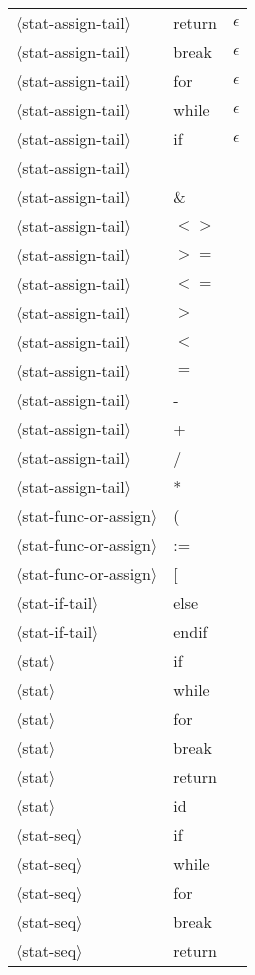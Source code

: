 \documentclass[11pt, fleqn]{article}
\newcommand{\atag}[1]{$\langle$#1$\rangle$}
\begin{document}
\begin{longtable}{l|l|l}
\atag{stat-assign-tail}			&	return			&	$\epsilon$	\\
\atag{stat-assign-tail}			&	break			&	$\epsilon$	\\
\atag{stat-assign-tail}			&	for			&	$\epsilon$	\\
\atag{stat-assign-tail}			&	while			&	$\epsilon$	\\
\atag{stat-assign-tail}			&	if			&	$\epsilon$	\\
\atag{stat-assign-tail}			&	\textbar		&		\\
\atag{stat-assign-tail}			&	\&			&		\\
\atag{stat-assign-tail}			&	$<>$			&		\\
\atag{stat-assign-tail}			&	$>=$			&		\\
\atag{stat-assign-tail}			&	$<=$			&		\\
\atag{stat-assign-tail}			&	$>$			&		\\
\atag{stat-assign-tail}			&	$<$			&		\\
\atag{stat-assign-tail}			&	$=$			&		\\
\atag{stat-assign-tail}			&	-			&		\\
\atag{stat-assign-tail}			&	+			&		\\
\atag{stat-assign-tail}			&	/			&		\\
\atag{stat-assign-tail}			&	*			&		\\
\atag{stat-func-or-assign}		&	(		&		\\
\atag{stat-func-or-assign}		&	:=			&	\\
\atag{stat-func-or-assign}		&	[		&		\\
\atag{stat-if-tail}				&	else		&		\\
\atag{stat-if-tail}				&	endif	&		\\
\atag{stat}						&	if		&			\\
\atag{stat}						&	while	&			\\
\atag{stat}						&	for		&			\\
\atag{stat}						&	break	&			\\
\atag{stat}						&	return	&			\\
\atag{stat}						&	id		&			\\
\atag{stat-seq}					&	if		&			\\
\atag{stat-seq}					&	while	&			\\
\atag{stat-seq}					&	for		&			\\
\atag{stat-seq}					&	break	&			\\
\atag{stat-seq}					&	return	&			\\

\end{longtable}
\end{document}
